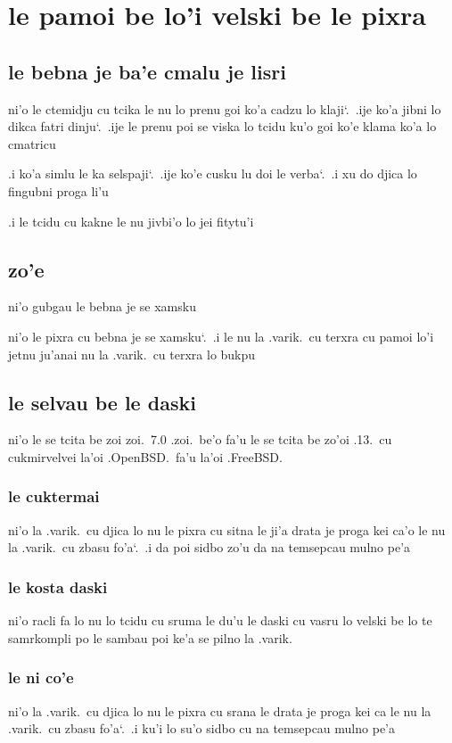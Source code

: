 \documentclass{report}
\newcommand\sds{\spacefactor\sfcode`.\ \space}
\begin{document}
\section{le pamoi be lo'i velski be le pixra}
\subsection{le bebna je ba'e cmalu je lisri}
ni'o le ctemidju cu tcika le nu lo prenu goi ko'a cadzu lo klaji\sds  .ije ko'a jibni lo dikca fatri dinju\sds  .ije le prenu poi se viska lo tcidu ku'o goi ko'e klama ko'a lo cmatricu

.i ko'a simlu le ka selspaji\sds  .ije ko'e cusku lu doi le verba\sds  .i xu do djica lo fingubni proga li'u

.i le tcidu cu kakne le nu jivbi'o lo jei fitytu'i

\subsection{zo'e}
ni'o gubgau le bebna je se xamsku

ni'o le pixra cu bebna je se xamsku\sds  .i le nu la .varik.\ cu terxra cu pamoi lo'i jetnu ju'anai nu la .varik.\ cu terxra lo bukpu

\subsection{le selvau be le daski}
ni'o le se tcita be zoi zoi.\ 7.0 .zoi.\ be'o fa'u le se tcita be zo'oi .13.\ cu cukmirvelvei la'oi .OpenBSD.\ fa'u la'oi .FreeBSD.

\subsubsection{le cuktermai}
ni'o la .varik.\ cu djica lo nu le pixra cu sitna le ji'a drata je proga kei ca'o le nu la .varik.\ cu zbasu fo'a\sds  .i da poi sidbo zo'u da na temsepcau mulno pe'a

\subsubsection{le kosta daski}
ni'o racli fa lo nu lo tcidu cu sruma le du'u le daski cu vasru lo velski be lo te samrkompli po le sambau poi ke'a se pilno la .varik.

\subsubsection{le ni co'e}
ni'o la .varik.\ cu djica lo nu le pixra cu srana le drata je proga kei ca le nu la .varik.\ cu zbasu fo'a\sds  .i ku'i lo su'o sidbo cu na temsepcau mulno pe'a
\end{document}
